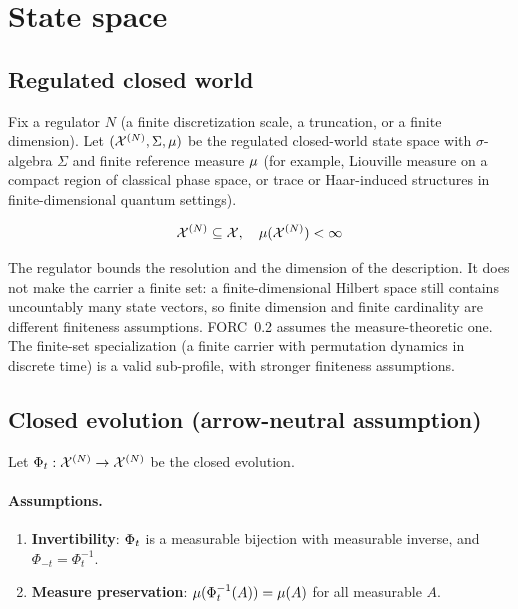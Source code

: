 \section{State space}\label{sec:state-space}

\subsection{Regulated closed world}

Fix a regulator $N$ (a finite discretization scale, a truncation, or a
finite dimension).  Let $(\mathcal{X}^{(N)}, \Sigma, \mu)$ be the regulated
closed-world state space with $\sigma$-algebra $\Sigma$ and finite reference
measure $\mu$ (for example, Liouville measure on a compact region of
classical phase space, or trace or Haar-induced structures in
finite-dimensional quantum settings).

\begin{equation}
  \mathcal{X}^{(N)} \subseteq \mathcal{X}, \quad \mu(\mathcal{X}^{(N)}) < \infty\label{eq:regulated-state-space}
\end{equation}

The regulator bounds the resolution and the dimension of the description.
It does not make the carrier a finite set: a finite-dimensional Hilbert
space still contains uncountably many state vectors, so finite dimension
and finite cardinality are different finiteness assumptions.  FORC~0.2
assumes the measure-theoretic one.  The finite-set specialization (a
finite carrier with permutation dynamics in discrete time) is a valid
sub-profile, with stronger finiteness assumptions.

\subsection{Closed evolution (arrow-neutral assumption)}

Let $\Phi_t : \mathcal{X}^{(N)} \to \mathcal{X}^{(N)}$ be the closed evolution.

\paragraph{Assumptions.}
\begin{enumerate}
  \item \textbf{Invertibility}: $\Phi_t$ is a measurable bijection
        with measurable inverse, and $\Phi_{-t} = \Phi_t^{-1}$.
  \item \textbf{Measure preservation}:
        $\mu(\Phi_t^{-1}(A)) = \mu(A)$ for all measurable $A$.
\end{enumerate}

